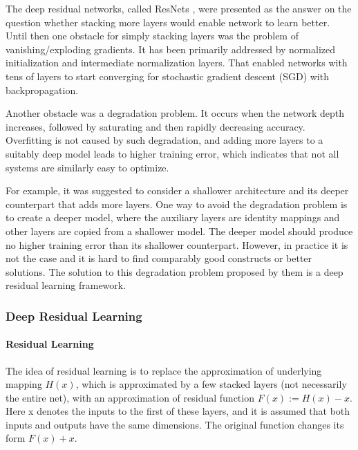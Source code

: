 \documentclass[
]{krantz}
\begin{document}
The deep residual networks, called ResNets \citep{ResNet}, were presented as the answer on the question whether stacking more layers would enable network to learn better. Until then one obstacle for simply stacking layers was the problem of vanishing/exploding gradients. It has been primarily addressed by normalized initialization and intermediate normalization layers. That enabled networks with tens of layers to start converging for stochastic gradient descent (SGD) with backpropagation.

Another obstacle was a degradation problem. It occurs when the network depth increases, followed by saturating and then rapidly decreasing accuracy. Overfitting is not caused by such degradation, and adding more layers to a suitably deep model leads to higher training error, which indicates that not all systems are similarly easy to optimize.

For example, it was suggested to consider a shallower architecture and its deeper counterpart that adds more layers. One way to avoid the degradation problem is to create a deeper model, where the auxiliary layers are identity mappings and other layers are copied from a shallower model. The deeper model should produce no higher training error than its shallower counterpart. However, in practice it is not the case and it is hard to find comparably good constructs or better solutions. The solution to this degradation problem proposed by them is a deep residual learning framework.

\hypertarget{deep-residual-learning}{%
\subsubsection{Deep Residual Learning}\label{deep-residual-learning}}

\hypertarget{residual-learning}{%
\paragraph{Residual Learning}\label{residual-learning}}

The idea of residual learning is to replace the approximation of underlying mapping \(H\left( x\right)\), which is approximated by a few stacked layers (not necessarily the entire net), with an approximation of residual function \(F(x):= H\left( x \right) − x\). Here x denotes the inputs to the first of these layers, and it is assumed that both inputs and outputs have the same dimensions. The original function changes its form \(F\left( x \right)+x\).
\end{document}
